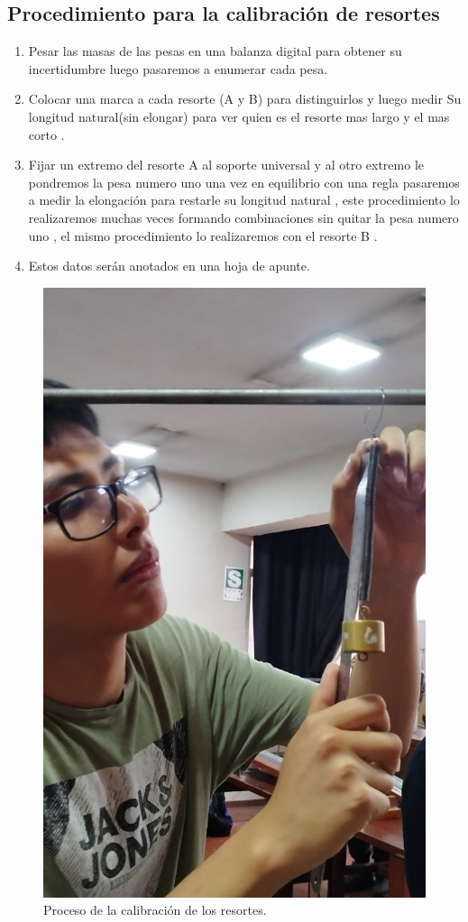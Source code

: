 \documentclass[../main.tex]{subfiles}
\begin{document}
\subsection{Procedimiento para la calibración de resortes}
\begin{enumerate}
  \item Pesar las masas de las pesas en una balanza digital para
  obtener su incertidumbre luego pasaremos a enumerar cada pesa.
  \item Colocar una marca a cada resorte (A y B) para distinguirlos y 
  luego medir Su longitud natural(sin elongar) para ver quien es el resorte mas largo y el mas corto .
  \item Fijar un extremo del resorte A al soporte universal y al otro extremo 
  le pondremos la pesa numero uno  una vez en equilibrio con una regla pasaremos a medir la elongación para restarle su longitud natural , este procedimiento lo realizaremos muchas veces formando combinaciones sin quitar la pesa numero uno , el mismo procedimiento lo realizaremos con el resorte B .
  \item Estos datos serán anotados en una hoja de apunte.
\end{enumerate}

\begin{figure}
  \centering
  \includegraphics[width=0.4\linewidth]{images/proc3.jpg}
  \caption{Proceso de la calibración de los resortes.}
  \label{fig:proc3}
\end{figure}
\end{document}
